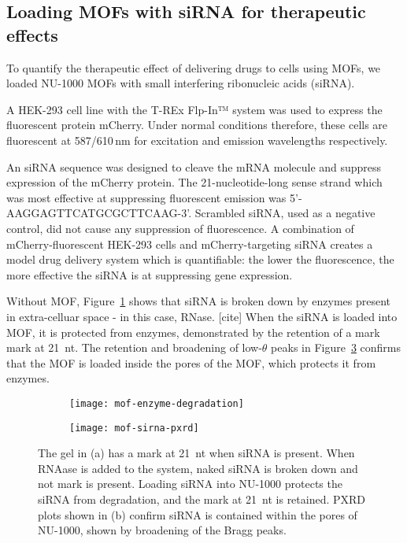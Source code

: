 \subsection{Loading MOFs with siRNA for therapeutic effects} \label{sec:MOF-siRNA}
To quantify the therapeutic effect of delivering drugs to cells using MOFs, we loaded NU-1000 MOFs with small interfering ribonucleic acids (siRNA). 

A HEK-293 cell line with the T-REx Flp-In™ system was used to express the fluorescent protein mCherry. 
Under normal conditions therefore, these cells are fluorescent at 587/610\,\si{\nano\meter} for excitation and emission wavelengths respectively. 

An siRNA sequence was designed to cleave the mRNA molecule and suppress expression of the mCherry protein.
The 21-nucleotide-long sense strand which was most effective at suppressing fluorescent emission was 5'-AAGGAGTTCATGCGCTTCAAG-3'. 
Scrambled siRNA, used as a negative control, did not cause any suppression of fluorescence.
A combination of mCherry-fluorescent HEK-293 cells and mCherry-targeting siRNA creates a model drug delivery system which is quantifiable: the lower the fluorescence, the more effective the siRNA is at suppressing gene expression. 

Without MOF, Figure~\ref{fig:mof-enzyme-degradation} shows that siRNA is broken down by enzymes present in extra-celluar space - in this case, RNase. [cite]
When the siRNA is loaded into MOF, it is protected from enzymes, demonstrated by the retention of a mark mark at \SI{21}{nt}. 
The retention and broadening of low-$\theta$ peaks in Figure~\ref{fig:mof-enzyme-pxrd} confirms that the MOF is loaded inside the pores of the MOF, which protects it from enzymes. 

\begin{figure}[htbp!]
	\centering
	\begin{subfigure}[b]{0.49\textwidth}
		\texttt{[image: mof-enzyme-degradation]}
		\caption{} \label{fig:mof-enzyme-degradation}
	\end{subfigure}
	\hfill
	\begin{subfigure}[b]{0.49\textwidth}
		\texttt{[image: mof-sirna-pxrd]}
		\caption{} \label{fig:mof-sirna-pxrd}
	\end{subfigure}			
	\caption[MOFs: NU-1000 protects siRNA from degradation by enzymes in extracellular space]{The gel in (a) has a mark at \SI{21}{nt} when siRNA is present. When RNAase is added to the system, naked siRNA is broken down and not mark is present. Loading siRNA into NU-1000 protects the siRNA from degradation, and the mark at \SI{21}{nt} is retained. PXRD plots shown in (b) confirm siRNA is contained within the pores of NU-1000, shown by broadening of the Bragg peaks.}
\label{fig:mof-enzyme-pxrd}
\end{figure}

